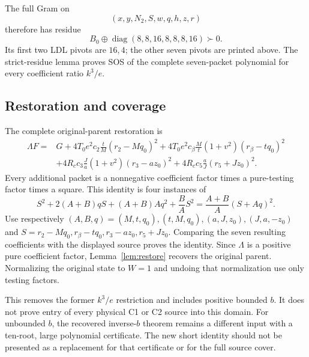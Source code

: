 The full Gram on
\[
\boxed{(x,y,N_2,S,w,q,h,z,r)}
\]
therefore has residue
\[
\boxed{B_0\oplus\operatorname{diag}(8,8,16,8,8,8,16)\succ0.}
\]
Its first two LDL pivots are $16,4$; the other seven pivots are printed above. The strict-residue lemma proves SOS of the complete seven-packet polynomial for every coefficient ratio $k^3/e$.

\subsection{Restoration and coverage}
The complete original-parent restoration is
\begin{align*}
\Lambda F={}&G
+4T_0e^2c_2\frac{t}{M}(r_2-Mq_0)^2
+4T_0e^2c_\beta\frac{M}{t}(1+v^2)(r_\beta-tq_0)^2\\
&+4R_cc_3\frac{J}{a}(1+v^2)(r_3-az_0)^2
+4R_cc_5\frac{a}{J}(r_5+Jz_0)^2.
\end{align*}
Every additional packet is a nonnegative coefficient factor times a pure-testing factor times a square. This identity is four instances of
\[
S^2+2(A+B)qS+(A+B)Aq^2+\frac BA S^2
=\frac{A+B}{A}(S+Aq)^2.
\]
Use respectively $(A,B,q)=(M,t,q_0),(t,M,q_0),(a,J,z_0),(J,a,-z_0)$ and $S=r_2-Mq_0,r_\beta-tq_0,r_3-az_0,r_5+Jz_0$. Comparing the seven resulting coefficients with the displayed source proves the identity. Since $\Lambda$ is a positive pure coefficient factor, Lemma~\ref{lem:restore} recovers the original parent. Normalizing the original state to $W=1$ and undoing that normalization use only testing factors.

This removes the former $k^3/e$ restriction and includes positive bounded $b$. It does not prove entry of every physical C1 or C2 source into this domain. For unbounded $b$, the recovered inverse-$b$ theorem remains a different input with a ten-root, large polynomial certificate. The new short identity should not be presented as a replacement for that certificate or for the full source cover.
